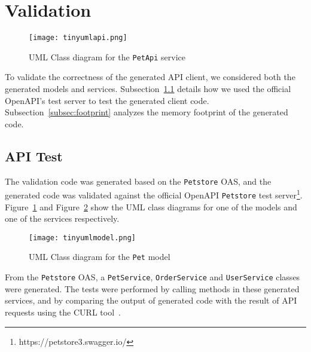 \documentclass[manuscript,screen]{acmart}
\begin{document}




\section{Validation}\label{sec:validation}

\begin{figure}[b!]
    \centering
    \texttt{[image: tinyumlapi.png]}
    \caption{UML Class diagram for the  \texttt{PetApi} service}
    \label{fig:testapi}
\end{figure}


To validate the correctness of the generated API client, we considered both the generated models and services. %
%
Subsection~\ref{subsec:apitest} details how we used the official OpenAPI's test server to test the generated client code. Subsection~\ref{subsec:footprint} analyzes the memory footprint of the generated code. 





\subsection{API Test}\label{subsec:apitest}


The validation code was generated based on the \texttt{Petstore} OAS, and the generated code was validated against the official OpenAPI \texttt{Petstore} test server\footnote{https://petstore3.swagger.io/}. 
Figure~\ref{fig:testapi} and Figure~\ref{fig:testmodel} show the UML class diagrams for one of the models and one of the services respectively. 




\begin{figure}[t!]
    \centering
    \texttt{[image: tinyumlmodel.png]}
    \caption{UML Class diagram for the  \texttt{Pet}  model}
    \label{fig:testmodel}
\end{figure}






 
From the \texttt{Petstore} OAS, a \texttt{PetService}, \texttt{OrderService} and \texttt{UserService} classes were generated. 
%
The tests were performed by calling methods in these generated services, and by comparing the output of generated code with the result of API requests using the CURL tool~\cite{CURL}. 
\end{document}
